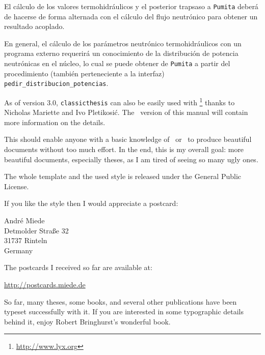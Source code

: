 El cálculo de los valores termohidráulicos y el posterior trapsaso a \texttt{Pumita} deberá de hacerse de forma alternada con el cálculo del flujo neutrónico para obtener un resultado acoplado. 

En general, el cálculo de los parámetros neutrónico termohidráulicos con un programa externo requerirá un conocimiento de la distribución de potencia neutrónicas en el núcleo, lo cual se puede obtener de \texttt{Pumita} a partir del procedimiento (también perteneciente a la interfaz) \texttt{pedir\_distribucion\_potencias}.




As of version 3.0, \texttt{classicthesis} can also be easily used with
\mLyX\footnote{\url{http://www.lyx.org}} thanks to Nicholas Mariette
and Ivo Pletikosić. The \mLyX\ version of this manual will contain
more information on the details.

This should enable anyone with a basic knowledge of \LaTeXe\ or \mLyX\ to
produce beautiful documents without too much effort. In the end, this
is my overall goal: more beautiful documents, especially theses, as I
am tired of seeing so many ugly ones.

The whole template and the used style is released under the
 General Public License.

If you like the style then I would appreciate a postcard:
\begin{center}
    André Miede \\
    Detmolder Straße 32 \\
    31737 Rinteln \\
    Germany
\end{center}
The postcards I received so far are available at:
\begin{center}
    \url{http://postcards.miede.de}
\end{center}
So far, many theses, some books, and several other publications have
been typeset successfully with it. If you are interested in some
typographic details behind it, enjoy Robert Bringhurst's wonderful book.

